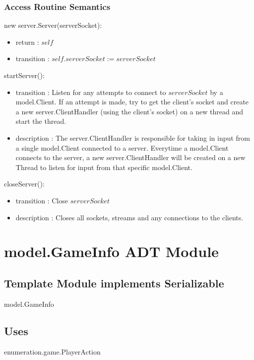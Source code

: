 \documentclass[12pt, titlepage]{article}
\begin{document}
    \subsubsection* {Access Routine Semantics}
    
        \noindent new server.Server(serverSocket):
        \begin{itemize}
        \item return : $self$
        \item transition : $self.serverSocket := serverSocket$
        \end{itemize}
        
        \noindent startServer():
        \begin{itemize}
        \item transition : Listen for any attempts to connect to $serverSocket$ by a model.Client. If an attempt is made, try to get the client's socket and create a new server.ClientHandler (using the client's socket) on a new thread and start the thread.
        \item description : The server.ClientHandler is responsible for taking in input from a single model.Client connected to a server. Everytime a model.Client connects to the server, a new server.ClientHandler will be created on a new Thread to listen for input from that specific model.Client.
        \end{itemize}
        
        \noindent closeServer():
        \begin{itemize}
        \item transition : Close $serverSocket$
        \item description : Closes all sockets,  streams and any connections to the clients.
        \end{itemize}
        
                
                        
        
\section* {model.GameInfo ADT Module}
    \subsection* {Template Module implements Serializable}
    model.GameInfo
    \subsection* {Uses}
    enumeration.game.PlayerAction
\end{document}
